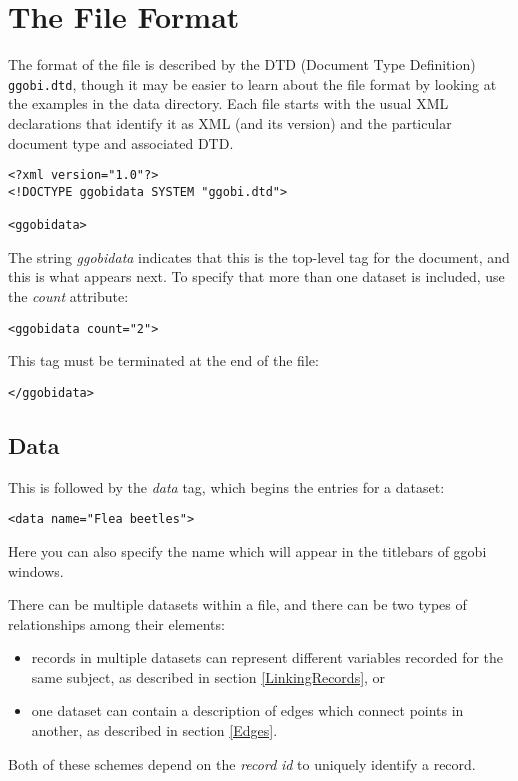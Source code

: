 \documentclass{article}
\def\XMLTag#1{\textit{#1}}
\def\XMLAttribute#1{\textsl{#1}}
\def\XMLElement#1{\XMLTag{#1}}
\begin{document}
\section{The File Format}

The format of the file is described by the DTD (Document Type
Definition) \texttt{ggobi.dtd}, though it may be easier to learn about
the file format by looking at the examples in the data directory.
Each file starts with the usual XML declarations that identify it as
XML (and its version) and the particular document type and associated
DTD.


\begin{verbatim}
<?xml version="1.0"?>
<!DOCTYPE ggobidata SYSTEM "ggobi.dtd">

<ggobidata>
\end{verbatim}
%
The string \XMLElement{ggobidata} indicates that this is the top-level
tag for the document, and this is what appears next.  To specify that
more than one dataset is included, use the \XMLAttribute{count}
attribute:
%
\begin{verbatim}
<ggobidata count="2">
\end{verbatim}
%
This tag must be terminated at the end of the file:
\begin{verbatim}
</ggobidata>
\end{verbatim}

\subsection{Data}

This is followed by the \XMLAttribute{data} tag, which begins the
entries for a dataset:

\begin{verbatim}
<data name="Flea beetles">
\end{verbatim}
%
Here you can also specify the name which will appear in the titlebars
of ggobi windows.

There can be multiple datasets within a file, and there can be two
types of relationships among their elements: 
\begin{itemize}
\item records in multiple datasets can represent different variables
  recorded for the same subject, as described in section
  \ref{LinkingRecords}, or
\item one dataset can contain a description of edges which connect
  points in another, as described in section \ref{Edges}.
\end{itemize}
Both of these schemes depend on the \XMLElement{record} \XMLAttribute{id} to
uniquely identify a record.
\end{document}
